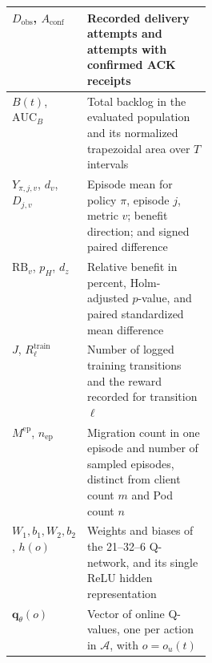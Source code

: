 \begin{longtable}{|>{\raggedright\arraybackslash}p{0.29\linewidth}|>{\raggedright\arraybackslash}p{}|}
		$D_{\mathrm{obs}}$, $A_{\mathrm{conf}}$
		& Recorded delivery attempts and attempts with confirmed ACK receipts \\ \hline
		$B(t)$, $\mathrm{AUC}_B$
		& Total backlog in the evaluated population and its normalized trapezoidal area over $T$ intervals \\ \hline
		$Y_{\pi,j,v}$, $d_v$, $D_{j,v}$
		& Episode mean for policy $\pi$, episode $j$, metric $v$; benefit direction; and signed paired difference \\ \hline
		$\mathrm{RB}_v$, $p_H$, $d_z$
		& Relative benefit in percent, Holm-adjusted $p$-value, and paired standardized mean difference \\ \hline
		$J$, $R^{\mathrm{train}}_\ell$
		& Number of logged training transitions and the reward recorded for transition $\ell$ \\ \hline
		$M^{\mathrm{ep}}$, $n_{\mathrm{ep}}$
		& Migration count in one episode and number of sampled episodes, distinct from client count $m$ and Pod count $n$ \\ \hline
		$W_1,b_1,W_2,b_2$, $h(o)$
		& Weights and biases of the 21--32--6 Q-network, and its single ReLU hidden representation \\ \hline
		$\mathbf{q}_\theta(o)$
		& Vector of online Q-values, one per action in $\mathcal{A}$, with $o=o_u(t)$ \\ \hline
\end{longtable}
\endgroup
